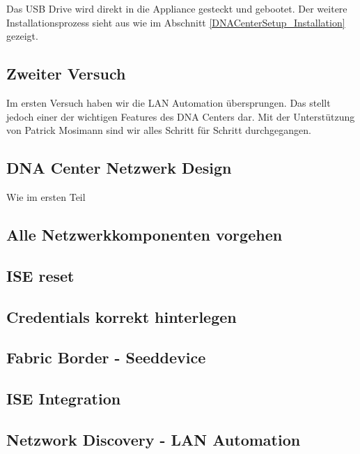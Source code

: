 Das USB Drive wird direkt in die Appliance gesteckt und gebootet. Der weitere Installationsprozess sieht aus wie im Abschnitt \ref{DNACenterSetup_Installation} gezeigt. 


\subsection{Zweiter Versuch}
Im ersten Versuch haben wir die LAN Automation übersprungen. Das stellt jedoch einer der wichtigen Features des DNA Centers dar. Mit der Unterstützung von Patrick Mosimann sind wir alles Schritt für Schritt durchgegangen. 

\subsection{DNA Center Netzwerk Design}
Wie im ersten Teil

\subsection{Alle Netzwerkkomponenten vorgehen}

\subsection{ISE reset}

\subsection{Credentials korrekt hinterlegen}

\subsection{Fabric Border - Seeddevice}

\subsection{ISE Integration}

\subsection{Netzwork Discovery - LAN Automation}

